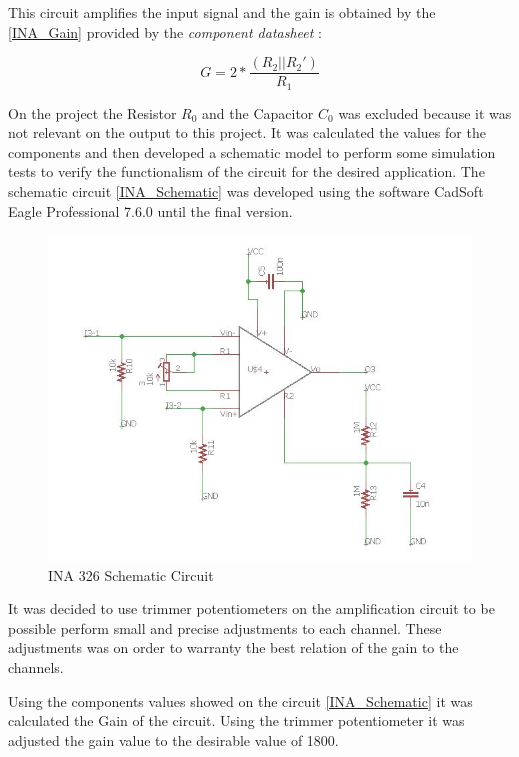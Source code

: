 This circuit amplifies the input signal and the gain is obtained by the \autoref{INA_Gain} provided by the \textit{component datasheet}
\cite{INA326}:

\begin{equation}
\label{INA_Gain}
G=2*\frac{(R_2||R_2 ')}{R_1}
\end{equation}

On the project the Resistor $R_0$ and the Capacitor $C_0$ was excluded because
it was not relevant on the output to this project. It was calculated the values
for the components and then developed a schematic model to perform some simulation tests
to verify the functionalism of the circuit for the desired application.
The schematic circuit \autoref{INA_Schematic} was developed using the software CadSoft Eagle Professional 7.6.0
until the final version.

\begin{figure}[!htpb]
\centering
\caption{INA 326 Schematic Circuit}
\label{INA_Schematic}
\includegraphics[scale=0.65]{images/INA_Schematic}
\end{figure}

It was decided to use trimmer potentiometers on the amplification circuit to be possible perform small and precise adjustments to each
channel. These adjustments was on order to warranty the best relation of the gain to the channels.

Using the components values showed on the circuit \autoref{INA_Schematic} it was calculated
the Gain of the circuit. Using the trimmer potentiometer it was adjusted the gain value to the desirable value
of 1800.

